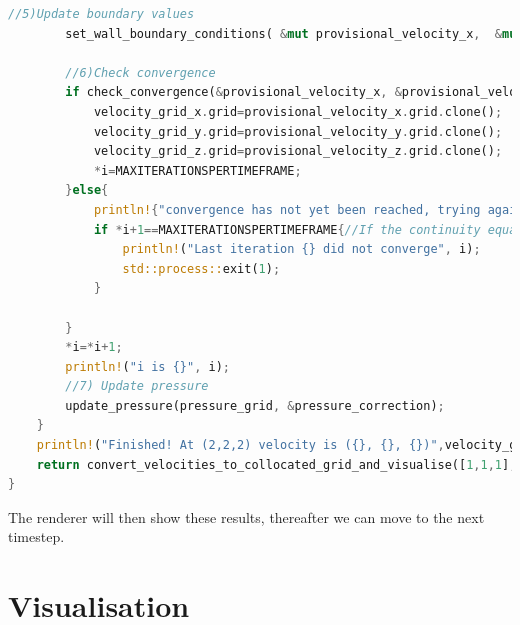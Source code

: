 \documentclass{article}
\begin{document}
\begin{lstlisting}[language=Rust, style=boxed, breaklines=true]
        //5)Update boundary values
        set_wall_boundary_conditions( &mut provisional_velocity_x,  &mut provisional_velocity_y,  &mut provisional_velocity_z, 1.0, time_step);
        
        //6)Check convergence
        if check_convergence(&provisional_velocity_x, &provisional_velocity_y, &provisional_velocity_z) {// If the continuity equation has converged we can go to the next timestep
            velocity_grid_x.grid=provisional_velocity_x.grid.clone();
            velocity_grid_y.grid=provisional_velocity_y.grid.clone();
            velocity_grid_z.grid=provisional_velocity_z.grid.clone();
            *i=MAXITERATIONSPERTIMEFRAME;
        }else{
            println!{"convergence has not yet been reached, trying again, iteration: {}", i};
            if *i+1==MAXITERATIONSPERTIMEFRAME{//If the continuity equation has not converged after many iterations something probably went wrong. Therefore the program will have to be terminated then.
                println!("Last iteration {} did not converge", i);
                std::process::exit(1);
            }
            
        }
        *i=*i+1;
        println!("i is {}", i);
        //7) Update pressure
        update_pressure(pressure_grid, &pressure_correction);
    }  
    println!("Finished! At (2,2,2) velocity is ({}, {}, {})",velocity_grid_x.grid[2][2][2], velocity_grid_y.grid[2][2][2],velocity_grid_z.grid[2][2][2]);
    return convert_velocities_to_collocated_grid_and_visualise([1,1,1], [PRESSUREGRIDSIZE[0]-1, PRESSUREGRIDSIZE[1]-1, PRESSUREGRIDSIZE[2]-1], [4,4,4], velocity_grid_x, velocity_grid_y, velocity_grid_z);
}
\end{lstlisting}
The renderer will then show these results, thereafter we can move to the next timestep.








\newpage  
\section{Visualisation} \label{Visualisation}
\end{document}
